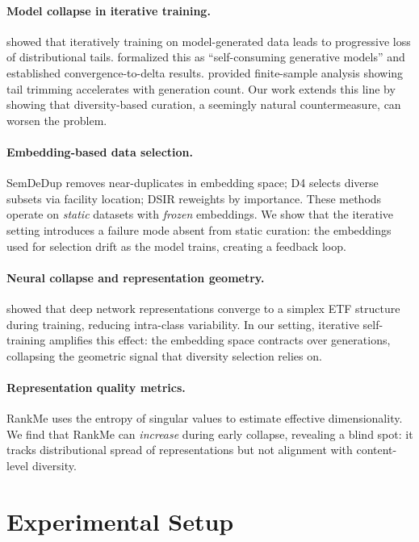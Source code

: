 \documentclass[11pt,a4paper]{article}
\begin{document}
\paragraph{Model collapse in iterative training.}
\cite{shumailov2024model} showed that iteratively training on model-generated data leads to progressive loss of distributional tails.
\cite{alemohammad2024selfconsuming} formalized this as ``self-consuming generative models'' and established convergence-to-delta results.
\cite{dohmatob2024tale} provided finite-sample analysis showing tail trimming accelerates with generation count.
Our work extends this line by showing that diversity-based curation, a seemingly natural countermeasure, can worsen the problem.

\paragraph{Embedding-based data selection.}
SemDeDup \cite{abbas2023semdedup} removes near-duplicates in embedding space; D4 \cite{tirumala2023d4} selects diverse subsets via facility location; DSIR \cite{xie2023dsir} reweights by importance.
These methods operate on \emph{static} datasets with \emph{frozen} embeddings.
We show that the iterative setting introduces a failure mode absent from static curation: the embeddings used for selection drift as the model trains, creating a feedback loop.

\paragraph{Neural collapse and representation geometry.}
\cite{papyan2020prevalence} showed that deep network representations converge to a simplex ETF structure during training, reducing intra-class variability.
In our setting, iterative self-training amplifies this effect: the embedding space contracts over generations, collapsing the geometric signal that diversity selection relies on.

\paragraph{Representation quality metrics.}
RankMe \cite{garrido2023rankme} uses the entropy of singular values to estimate effective dimensionality.
We find that RankMe can \emph{increase} during early collapse, revealing a blind spot: it tracks distributional spread of representations but not alignment with content-level diversity.

\section{Experimental Setup}
\end{document}
